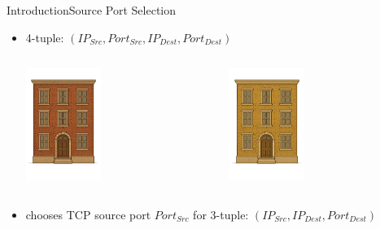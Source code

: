 \documentclass[aspectratio=169, hyperref={colorlinks=true, allcolors=SecondaryColor}, c]{beamer}
\begin{document}
\begin{frame}[fragile]{Introduction}{Source Port Selection}
	\begin{itemize}
    \item \alert{4-tuple}: $(IP_{Src}, Port_{Src}, IP_{Dest}, Port_{Dest})$
    \begin{columns}
      \begin{column}{0.5\textwidth}
        \includegraphics[width=0.4\textwidth]{./figures/apartment1.png}
      \end{column}
      \begin{column}{0.5\textwidth}
        \raggedleft
        \includegraphics[width=0.4\textwidth]{./figures/apartment2.png}
      \end{column}
    \end{columns}
    \item chooses TCP \alert{source port} $Port_{Src}$ for \alert{3-tuple}: $(IP_{Src}, IP_{Dest}, Port_{Dest})$
	\end{itemize}
\end{frame}
\end{document}
